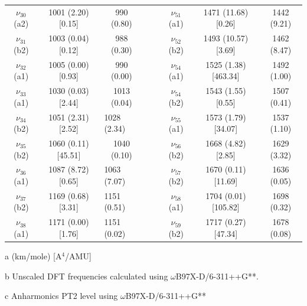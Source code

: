 \begin{table}[H]
\begin{center}
\begin{threeparttable}
{\begin{tabular}{c c c c c c c c}
$\nu_{30}$ (a2) & 1001 (2.20) [0.15] & 990 (0.80) &  &  & $\nu_{51}$ (a1) & 1471 (11.68) [0.26] & 1442 (9.21)  \\ 
$\nu_{31}$ (b2) & 1003 (0.04) [0.12] & 988 (0.30) &  &  & $\nu_{52}$ (b2) & 1493 (10.57) [3.69] & 1462 (8.47) \\ 
$\nu_{32}$ (a1)
& 1005 (0.00) [0.93] & 990 (0.00) &  &  & $\nu_{54}$ (a1) & 1525 (1.38) [463.34] & 1492 (1.00) \\ 
$\nu_{33}$ (a1) & 1030 (0.03) [2.44] & 1013 (0.04) &  &  &   $\nu_{54}$ (b2) & 1543 (1.55) [0.55] & 1507 (0.41) \\ 
$\nu_{34}$ (b2) & 1051 (2.31) [2.52] & \multicolumn{1}{l}{1028 (2.34)} &  &  &   $\nu_{55}$ (a1) & 1573 (1.79) [34.07] & 1537 (1.10) \\ 
$\nu_{35}$ (b2)  & 1060 (0.11) [45.51] & 1040 (0.10) &  &  & $\nu_{56}$ (b2) & 1668 (4.82) [2.85] & 1629 (3.32) \\ 
$\nu_{36}$ (a1) & 1087 (8.72) [0.65] & \multicolumn{1}{l}{1063 (7.07)} &  &  & $\nu_{57}$ (b2) & 1670 (0.11) [11.69] & 1636 (0.05) \\ 
$\nu_{37}$ (b2) & 1169 (0.68) [3.31] & \multicolumn{1}{l}{1151 (0.51)} &  &  & $\nu_{58}$ (a1)& 1704 (0.01) [105.82] & 1698 (0.32) \\ 
$\nu_{38}$ (a1) & 1171 (0.00) [1.76] & \multicolumn{1}{l}{1151 (0.02)} &  &  & $\nu_{59}$(b2) & 1717 (0.27) [47.34] & 1678 (0.08) \\ 		
	\bottomrule
\end{tabular}}

\begin{tablenotes}
	\item[a] (km/mole) [A$^{4}$/AMU]
	\item[b] Unscaled DFT frequencies calculated using $\omega$B97X-D/6-311++G**.
	\item[c] Anharmonics PT2 level using $\omega$B97X-D/6-311++G** 
\end{tablenotes}
\end{threeparttable}
\end{center}
\label{freq-Cyclopentaphenanthrene}
\end{table}

			


